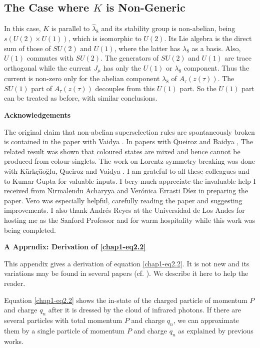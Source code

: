 \subsection{The Case where $K$ is Non-Generic}\label{chap1-sec4.1}

In this case, $K$ is parallel to $\hat{\lambda}_8$ and its stability group is non-abelian, being $s(U(2) \times U(1))$, which is isomorphic to $U(2)$. Its Lie algebra is the direct sum of those of $SU(2)$ and $U(1)$, where the latter has $\lambda_8$ as a basis. Also, \underline{$U(1)$} commutes with \underline{$SU(2)$}. The generators of \underline{$SU(2)$} and \underline{$U(1)$} are trace orthogonal while the current $J_\mu$ has only the \underline{$U(1)$} or $\lambda_8$ component. Thus the current is non-zero only for the abelian component $\lambda_8$ of $A_\tau(z (\tau))$. The \underline{$SU(1)$} part of $A_\tau (z(\tau))$ decouples from this \underline{$U(1)$} part. So the \underline{$U(1)$} part can be treated as before, with similar conclusions.

\noindent \textbf{\large Acknowledgements}
\medskip

The original claim that non-abelian superselection rules are spontaneously broken is contained in the paper with Vaidya \cite{key1}. In papers with Queiroz and Baidya \cite{key10, key13}, The related result was shown that coloured states are mixed and hence cannot be produced from colour singlets. The work on Lorentz symmetry breaking was done with K\"urk\c{c}\"{u}o\u{g}lu, Queiroz and Vaidya \cite{key4}. I am grateful to all these colleagues and to Kumar Gupta for valuable inputs. I bery much appreciate the invaluable help I received from Nirmalendu Acharyya and Ver\'onica Errasti D\'iez in preparing the paper. Vero was especially helpful, carefully reading the paper and suggesting improvements. I also thank Andr\'es Reyes at the Universidad de Los Andes for hosting me as the Sanford Professor and for warm hospitality while this work was being completed.

\medskip
\noindent \textbf{\large A Apprndix: Derivation of \eqref{chap1-eq2.2}}
\medskip

This appendix gives a derivation of equation \eqref{chap1-eq2.2}. It is not new and its variations may be found in several papers (cf. \cite{key3, key6, key14}). We describe it here to help the reader.

Equation \eqref{chap1-eq2.2} shows the in-state of the charged particle of momentum $P$ and charge $q_n$ after it is dressed by the cloud of infrared photons. If there are several particles with total momentum $P$ and charge $q_n$, we can approximate them by a single particle of momentum $P$ and charge $q_n$ as explained by previous works.


